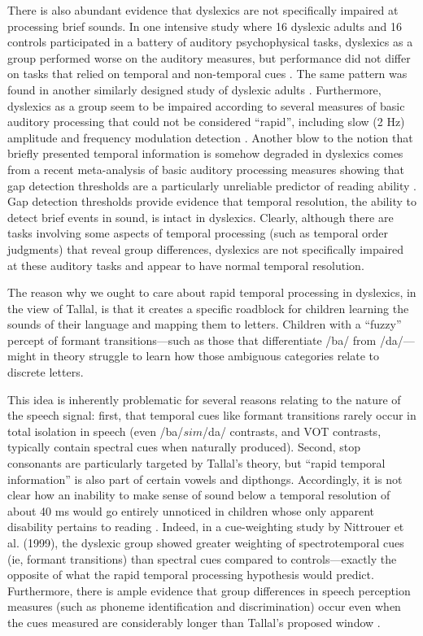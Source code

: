 \documentclass[../uwthesis.tex]{subfiles}
\begin{document}
There is also abundant evidence that dyslexics are not specifically impaired at processing
brief sounds. In one intensive study where 16 dyslexic adults and 16 controls participated in a battery
of auditory psychophysical tasks, dyslexics as a group performed worse on the auditory measures,
but performance did not differ on tasks that relied on temporal and non-temporal cues \cite{Ramus2003TheoriesAdults}. The same pattern was found in another similarly designed study of dyslexic adults \cite{Amitay2002DisabledDeficit.}. Furthermore, dyslexics as a group seem to be impaired according to several measures of
basic auditory processing that could not be considered “rapid”, including slow (2 Hz) amplitude and
frequency modulation detection 
\cite{Witton1998SensitivityReaders,Lorenzi2000UseDyslexi, Stuart2006ASample}.
Another blow to the notion that briefly presented temporal information is somehow degraded
in dyslexics comes from a recent meta-analysis of basic auditory processing measures showing that
gap detection thresholds are a particularly unreliable predictor of reading ability  \cite{Hamalainen2013BasicDyslexia}. Gap detection thresholds provide evidence that temporal resolution,
the ability to detect brief events in sound, is intact in dyslexics. Clearly, although there are tasks
involving some aspects of temporal processing (such as temporal order judgments) that reveal group
differences, dyslexics are not specifically impaired at these auditory tasks and appear to have normal
temporal resolution.

The reason why we ought to care about rapid temporal processing in dyslexics, in the view of Tallal, is that it creates a specific roadblock for children learning the sounds of their language and mapping them to letters. Children with a “fuzzy” percept of formant transitions---such as those that
differentiate /ba/ from /da/---might in theory struggle to learn how those ambiguous categories relate to discrete letters. 

This idea is inherently problematic for several reasons relating to the nature of the speech signal: first, that temporal cues like formant transitions rarely occur in total isolation
in speech (even /ba/$sim$/da/ contrasts, and VOT contrasts, typically contain spectral cues when
naturally produced). Second, stop consonants are particularly targeted by Tallal’s theory, but “rapid
temporal information” is also part of certain vowels and dipthongs. Accordingly, it is not clear how
an inability to make sense of sound below a temporal resolution of about 40 ms would go entirely
unnoticed in children whose only apparent disability pertains to reading \cite{Nittrouer1999DoProblems}. Indeed,
in a cue-weighting study by Nittrouer et al. (1999), the dyslexic group showed greater weighting of spectrotemporal cues (ie, formant transitions) than spectral cues compared to controls—exactly the opposite of what the rapid temporal processing hypothesis would predict. Furthermore, there is
ample evidence that group differences in speech perception measures (such as phoneme identification and discrimination) occur even when the cues measured are considerably longer than
Tallal’s proposed window \cite{Noordenbos2015TheMeta-Analysis}.
\end{document}
